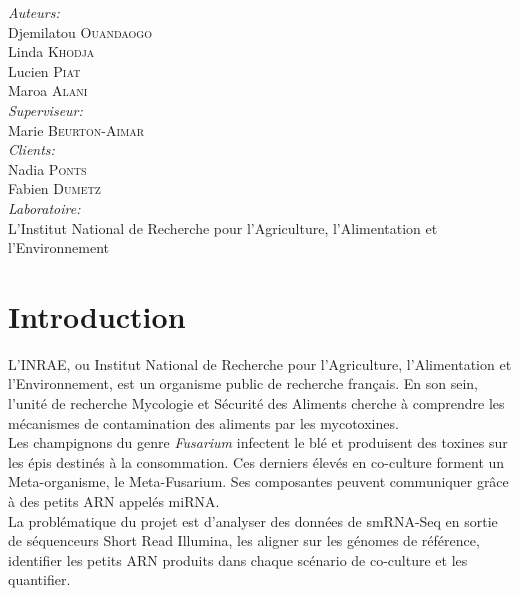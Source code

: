 \documentclass{report}
\begin{document}
\begin{titlepage}
\Large \emph{Auteurs:}\\
Djemilatou \textsc{Ouandaogo}\\
Linda \textsc{Khodja}\\
Lucien \textsc{Piat}\\
Maroa \textsc{Alani}\\[1cm]

\Large \emph{Superviseur:}\\
 Marie \textsc{Beurton-Aimar}\\[1cm]

\Large \emph{Clients:}\\
Nadia \textsc{Ponts}\\
Fabien \textsc{Dumetz}\\[1cm]

\Large \emph{Laboratoire:}\\
L’Institut National de Recherche pour l’Agriculture, l’Alimentation et l’Environnement\\[1.5cm]
 
\reportyear
\vfill
\end{titlepage}

\tableofcontents

\newpage

\chapter*{Introduction}

L'INRAE, ou Institut National de Recherche pour l'Agriculture, l'Alimentation et l'Environnement, est un organisme public de recherche français. En son sein,  l’unité de recherche Mycologie et Sécurité des Aliments cherche à comprendre les mécanismes de contamination des aliments par les mycotoxines. \cite{inrae} \\

Les champignons du genre \textit{Fusarium} infectent le blé et produisent des toxines sur les épis destinés à la consommation. Ces derniers élevés en co-culture forment un Meta-organisme, le Meta-Fusarium. Ses composantes peuvent communiquer grâce à des petits ARN appelés miRNA. \\

La problématique du projet est d’analyser des données de smRNA-Seq en sortie de séquenceurs Short Read Illumina, les aligner sur les génomes de référence, identifier les petits ARN produits dans chaque scénario de co-culture et les quantifier.\\
\end{document}
